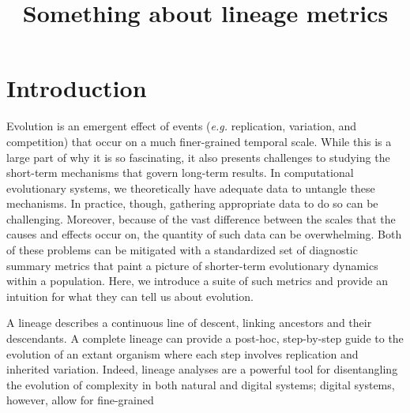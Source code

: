 \documentclass[letterpaper]{article}
\title{Something about lineage metrics}
\begin{document}
\maketitle

\begin{abstract}

\end{abstract}

\section{Introduction}

Evolution is an emergent effect of events (\textit{e.g.} replication, variation, and competition) that occur on a much finer-grained temporal scale. While this is a large part of why it is so fascinating, it also presents challenges to studying the short-term mechanisms that govern long-term results. In computational evolutionary systems, we theoretically have adequate data to untangle these mechanisms. In practice, though, gathering appropriate data to do so can be challenging. Moreover, because of the vast difference between the scales that the causes and effects occur on, the quantity of such data can be overwhelming. Both of these problems can be mitigated with a standardized set of diagnostic summary metrics that paint a picture of shorter-term evolutionary dynamics within a population. Here, we  introduce a suite of such metrics and provide an intuition for what they can tell us about evolution.






A lineage describes a continuous line of descent, linking ancestors and their descendants. A complete lineage can provide a post-hoc, step-by-step guide to the evolution of an extant organism where each step involves replication and inherited variation. Indeed, lineage analyses are a powerful tool for disentangling the evolution of complexity in both natural and digital systems; digital systems, however, allow for fine-grained 
\end{document}
